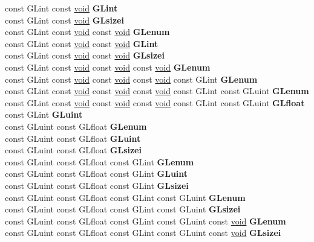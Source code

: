 \begin{DoxyCompactItemize}
\begin{tabbing}
\>const GLint const \hyperlink{interfacevoid}{void} {\bfseries GLint}\\
\>const GLint const \hyperlink{interfacevoid}{void} {\bfseries GLsizei}\\
\>const GLint const \hyperlink{interfacevoid}{void} const \hyperlink{interfacevoid}{void} {\bfseries GLenum}\\
\>const GLint const \hyperlink{interfacevoid}{void} const \hyperlink{interfacevoid}{void} {\bfseries GLint}\\
\>const GLint const \hyperlink{interfacevoid}{void} const \hyperlink{interfacevoid}{void} {\bfseries GLsizei}\\
\>const GLint const \hyperlink{interfacevoid}{void} const \hyperlink{interfacevoid}{void} const \hyperlink{interfacevoid}{void} {\bfseries GLenum}\\
\>const GLint const \hyperlink{interfacevoid}{void} const \hyperlink{interfacevoid}{void} const \hyperlink{interfacevoid}{void} const GLint {\bfseries GLenum}\\
\>const GLint const \hyperlink{interfacevoid}{void} const \hyperlink{interfacevoid}{void} const \hyperlink{interfacevoid}{void} const GLint const GLuint {\bfseries GLenum}\\
\>const GLint const \hyperlink{interfacevoid}{void} const \hyperlink{interfacevoid}{void} const \hyperlink{interfacevoid}{void} const GLint const GLuint {\bfseries GLfloat}\\
\>const GLint {\bfseries GLuint}\\
\>const GLuint const GLfloat {\bfseries GLenum}\\
\>const GLuint const GLfloat {\bfseries GLuint}\\
\>const GLuint const GLfloat {\bfseries GLsizei}\\
\>const GLuint const GLfloat const GLint {\bfseries GLenum}\\
\>const GLuint const GLfloat const GLint {\bfseries GLuint}\\
\>const GLuint const GLfloat const GLint {\bfseries GLsizei}\\
\>const GLuint const GLfloat const GLint const GLuint {\bfseries GLenum}\\
\>const GLuint const GLfloat const GLint const GLuint {\bfseries GLsizei}\\
\>const GLuint const GLfloat const GLint const GLuint const \hyperlink{interfacevoid}{void} {\bfseries GLenum}\\
\>const GLuint const GLfloat const GLint const GLuint const \hyperlink{interfacevoid}{void} {\bfseries GLsizei}\\

\end{tabbing}
\end{DoxyCompactItemize}
